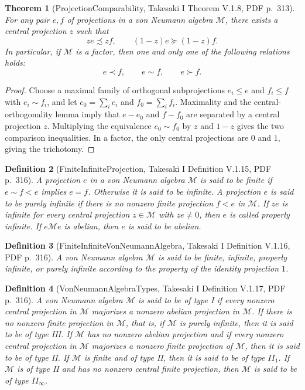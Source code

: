 \documentclass{article}
\newtheorem{definition}{Definition}
\newtheorem{theorem}[definition]{Theorem}
\begin{document}
\begin{theorem}[ProjectionComparability, Takesaki I Theorem V.1.8, PDF p.~313]
For any pair \(e,f\) of projections in a von Neumann algebra \(\mathcal M\),
there exists a central projection \(z\) such that
\[
  ze\precsim zf,\qquad (1-z)e\succeq (1-z)f.
\]
In particular, if \(\mathcal M\) is a factor, then one and only one of the
following relations holds:
\[
  e\prec f,\qquad e\sim f,\qquad e\succ f.
\]
\end{theorem}

\begin{proof}
Choose a maximal family of orthogonal subprojections \(e_i\leq e\) and
\(f_i\leq f\) with \(e_i\sim f_i\), and let \(e_0=\sum_i e_i\) and
\(f_0=\sum_i f_i\).  Maximality and the central-orthogonality lemma imply
that \(e-e_0\) and \(f-f_0\) are separated by a central projection \(z\).
Multiplying the equivalence \(e_0\sim f_0\) by \(z\) and \(1-z\) gives the
two comparison inequalities.  In a factor, the only central projections are
\(0\) and \(1\), giving the trichotomy.
\end{proof}

\begin{definition}[FiniteInfiniteProjection, Takesaki I Definition V.1.15, PDF p.~316]
A projection \(e\) in a von Neumann algebra \(\mathcal M\) is said to be
finite if \(e\sim f<e\) implies \(e=f\).  Otherwise it is said to be
infinite.  A projection \(e\) is said to be purely infinite if there is no
nonzero finite projection \(f<e\) in \(\mathcal M\).  If \(ze\) is infinite
for every central projection \(z\in\mathcal M\) with \(ze\neq0\), then \(e\)
is called properly infinite.  If \(e\mathcal M e\) is abelian, then \(e\) is
said to be abelian.
\end{definition}

\begin{definition}[FiniteInfiniteVonNeumannAlgebra, Takesaki I Definition V.1.16, PDF p.~316]
A von Neumann algebra \(\mathcal M\) is said to be finite, infinite, properly
infinite, or purely infinite according to the property of the identity
projection \(1\).
\end{definition}

\begin{definition}[VonNeumannAlgebraTypes, Takesaki I Definition V.1.17, PDF p.~316]
A von Neumann algebra \(\mathcal M\) is said to be of type I if every nonzero
central projection in \(\mathcal M\) majorizes a nonzero abelian projection
in \(\mathcal M\).  If there is no nonzero finite projection in
\(\mathcal M\), that is, if \(\mathcal M\) is purely infinite, then it is said
to be of type III.  If \(\mathcal M\) has no nonzero abelian projection and if
every nonzero central projection in \(\mathcal M\) majorizes a nonzero finite
projection of \(\mathcal M\), then it is said to be of type II.  If
\(\mathcal M\) is finite and of type II, then it is said to be of type
\(II_1\).  If \(\mathcal M\) is of type II and has no nonzero central finite
projection, then \(\mathcal M\) is said to be of type \(II_\infty\).
\end{definition}
\end{document}
